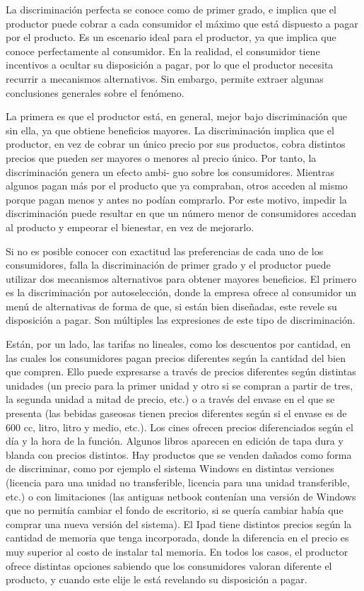 \documentclass[
  12pt,
  spanish,
]{book}
\begin{document}
La discriminación perfecta se conoce como de primer grado, e implica que
el productor puede cobrar a cada consumidor el máximo que está dispuesto
a pagar por el producto. Es un escenario ideal para el productor, ya que
implica que conoce perfectamente al consumidor. En la realidad, el
consumidor tiene incentivos a ocultar su disposición a pagar, por lo que
el productor necesita recurrir a mecanismos alternativos. Sin embargo,
permite extraer algunas conclusiones generales sobre el fenómeno.

La primera es que el productor está, en general, mejor bajo
discriminación que sin ella, ya que obtiene beneficios mayores. La
discriminación implica que el productor, en vez de cobrar un único
precio por sus productos, cobra distintos precios que pueden ser mayores
o menores al precio único. Por tanto, la discriminación genera un efecto
ambi- guo sobre los consumidores. Mientras algunos pagan más por el
producto que ya compraban, otros acceden al mismo porque pagan menos y
antes no podían comprarlo. Por este motivo, impedir la discriminación
puede resultar en que un número menor de consumidores accedan al
producto y empeorar el bienestar, en vez de mejorarlo.

Si no es posible conocer con exactitud las preferencias de cada uno de
los consumidores, falla la discriminación de primer grado y el productor
puede utilizar dos mecanismos alternativos para obtener mayores
beneficios. El primero es la discriminación por autoselección, donde la
empresa ofrece al consumidor un menú de alternativas de forma de que, si
están bien diseñadas, este revele su disposición a pagar. Son múltiples
las expresiones de este tipo de discriminación.

Están, por un lado, las tarifas no lineales, como los descuentos por
cantidad, en las cuales los consumidores pagan precios diferentes según
la cantidad del bien que compren. Ello puede expresarse a través de
precios diferentes según distintas unidades (un precio para la primer
unidad y otro si se compran a partir de tres, la segunda unidad a mitad
de precio, etc.) o a través del envase en el que se presenta (las
bebidas gaseosas tienen precios diferentes según si el envase es de 600
cc, litro, litro y medio, etc.). Los cines ofrecen precios diferenciados
según el día y la hora de la función. Algunos libros aparecen en edición
de tapa dura y blanda con precios distintos. Hay productos que se venden
dañados como forma de discriminar, como por ejemplo el sistema Windows
en distintas versiones (licencia para una unidad no transferible,
licencia para una unidad transferible, etc.) o con limitaciones (las
antiguas netbook contenían una versión de Windows que no permitía
cambiar el fondo de escritorio, si se quería cambiar había que comprar
una nueva versión del sistema). El Ipad tiene distintos precios según la
cantidad de memoria que tenga incorporada, donde la diferencia en el
precio es muy superior al costo de instalar tal memoria. En todos los
casos, el productor ofrece distintas opciones sabiendo que los
consumidores valoran diferente el producto, y cuando este elije le está
revelando su disposición a pagar.
\end{document}
